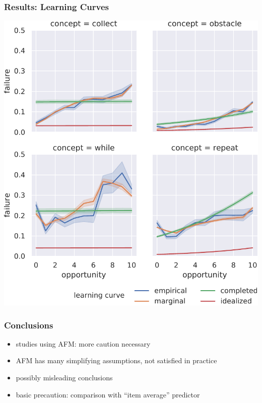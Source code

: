 \documentclass[bigger]{beamer}
\begin{document}
\begin{frame}
  \frametitle{Results: Learning Curves}

  \begin{center}
    \includegraphics[width=.6\linewidth]{learning_curves}
  \end{center}
\end{frame}

\begin{frame}
  \frametitle{Conclusions}

  \begin{itemize}
  \item studies using AFM: more caution necessary
  \item AFM has many simplifying assumptions, not satisfied in practice
  \item possibly misleading conclusions
  \item basic precaution: comparison with ``item average'' predictor
  \end{itemize}

\end{frame}

\end{document}
